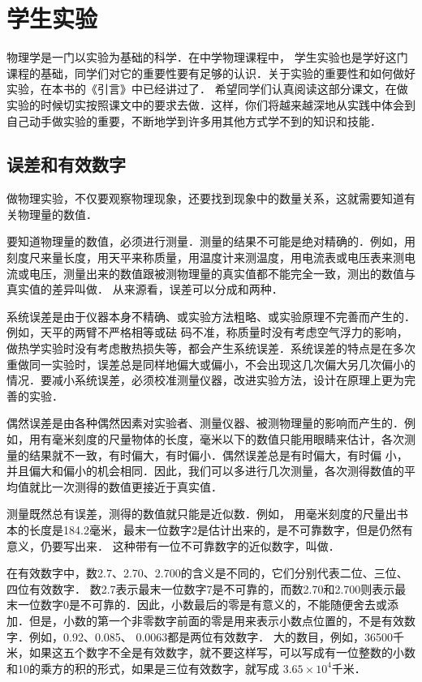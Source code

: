 \chapter{学生实验}

物理学是一门以实验为基础的科学．在中学物理课程中，
学生实验也是学好这门课程的基础，同学们对它的重要性要有足够的认识．关于实验的重要性和如何做好实验，在本书的《引言》中已经讲过了．
希望同学们认真阅读这部分课文，在做实验的时候切实按照课文中的要求去做．这样，你们将越来越深地从实践中体会到自己动手做实验的重要，不断地学到许多用其他方式学不到的知识和技能．
	
\section*{误差和有效数字}

做物理实验，不仅要观察物理现象，还要找到现象中的数量关系，这就需要知道有关物理量的数值．

要知道物理量的数值，必须进行测量．测量的结果不可能是绝对精确的．例如，用刻度尺来量长度，用天平来称质量，用温度计来测温度，用电流表或电压表来测电流或电压，测量出来的数值跟被测物理量的真实值都不能完全一致，测出的数值与真实值的差异叫做．
从来源看，误差可以分成和两种．

系统误差是由于仪器本身不精确、或实验方法粗略、或实验原理不完善而产生的．例如，天平的两臂不严格相等或砝
码不准，称质量时没有考虑空气浮力的影响，做热学实验时没有考虑散热损失等，都会产生系统误差．系统误差的特点是在多次重做同一实验时，误差总是同样地偏大或偏小，不会出现这几次偏大另几次偏小的情况．要减小系统误差，必须校准测量仪器，改进实验方法，设计在原理上更为完善的实验．

偶然误差是由各种偶然因素对实验者、测量仪器、被测物理量的影响而产生的．例如，用有毫米刻度的尺量物体的长度，毫米以下的数值只能用眼睛来估计，各次测量的结果就不一致，有时偏大，有时偏小．偶然误差总是有时偏大，有时偏
小，并且偏大和偏小的机会相同．因此，我们可以多进行几次测量，各次测得数值的平均值就比一次测得的数值更接近于真实值．

测量既然总有误差，测得的数值就只能是近似数．例如，
用毫米刻度的尺量出书本的长度是184.2毫米，最末一位数字2是估计出来的，是不可靠数字，但是仍然有意义，仍要写出来．
这种带有一位不可靠数字的近似数字，叫做．

在有效数字中，数2.7、2.70、2.700的含义是不同的，它们分别代表二位、三位、四位有效数字．
数2.7表示最末一位数字7是不可靠的，而数2.70和2.700则表示最末一位数字0是不可靠的．因此，小数最后的零是有意义的，不能随便舍去或添加．但是，小数的第一个非零数字前面的零是用来表示小数点位置的，不是有效数字．例如，0.92、0.085、 0.0063都是两位有效数字．
大的数目，例如，36500千米，如果这五个数字不全是有效数字，就不要这样写，可以写成有一位整数的小数和10的乘方的积的形式，如果是三位有效数字，就写成
$3.65\times 10^4$千米．

